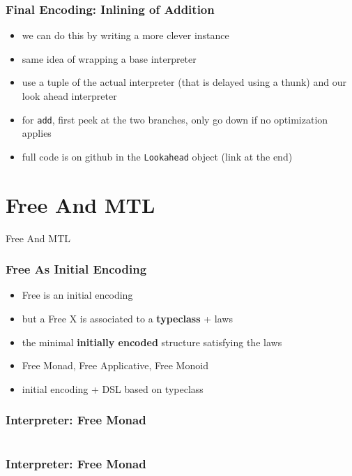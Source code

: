 \documentclass[aspectratio=169, hyperref={colorlinks, linkcolor=beamer@centricgreen}, urlcolor=links]{beamer}
\begin{document}
\begin{frame}
  \frametitle{Final Encoding: Inlining of Addition}
  \begin{itemize}
  \item we can do this by writing a more clever instance
  \item same idea of wrapping a base interpreter
  \item use a tuple of the actual interpreter (that is delayed using a
    thunk) and our look ahead interpreter
  \item for \texttt{add}, first peek at the two branches, only go down if no optimization applies
  \item full code is on github in the \texttt{Lookahead} object (link at the end)
  \end{itemize}
\end{frame}

\section{Free And MTL}\label{sec:free-and-mtl}

\begin{frame}
  \begin{center}
    \Huge
    Free And MTL
  \end{center}
\end{frame}

\begin{frame}
  \frametitle{Free As Initial Encoding}
  \begin{itemize}
  \item Free is an initial encoding
  \item but a Free X is associated to a \textbf{typeclass} + laws
  \item the minimal \textbf{initially encoded} structure satisfying
    the laws
  \item Free Monad, Free Applicative, Free Monoid
  \item initial encoding + DSL based on typeclass
  \end{itemize}
\end{frame}

\begin{frame}
  \frametitle{Interpreter: Free Monad}
  \inputminted[fontsize=\footnotesize]{scala}{snippets/initial-free-expr.scala}
\end{frame}

\begin{frame}
  \frametitle{Interpreter: Free Monad}
  \inputminted[fontsize=\footnotesize]{scala}{snippets/initial-free-ctors.scala}
\end{frame}
\end{document}
